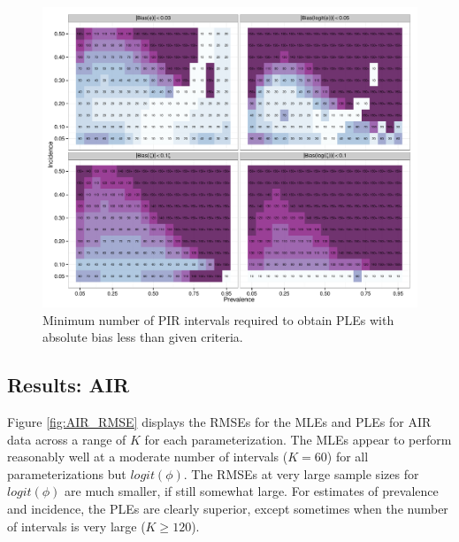\documentclass[man, noextraspace, floatsintext]{apa6}\usepackage[]{graphicx}\usepackage[]{color}
\makeatletter
\def\maxwidth{ %
  \ifdim\Gin@nat@width>\linewidth
    \linewidth
  \else
    \Gin@nat@width
  \fi
}
\newenvironment{knitrout}{}{} %
\makeatother
\begin{document}
\begin{knitrout}
\color{fgcolor}\begin{figure}[tb]


{\centering \includegraphics[width=\maxwidth]{fig/PIR_sample_size} 

}

\caption[Minimum number of PIR intervals required to obtain PLEs with absolute bias less than given criteria]{Minimum number of PIR intervals required to obtain PLEs with absolute bias less than given criteria.\label{fig:PIR_sample_size}}
\end{figure}


\end{knitrout}

\subsection{Results: AIR}
Figure \ref{fig:AIR_RMSE} displays the RMSEs for the MLEs and PLEs for AIR data across a range of $K$ for each parameterization. The MLEs appear to perform reasonably well at a moderate number of intervals ($K = 60$) for all parameterizations but $logit(\phi)$. The RMSEs at very large sample sizes for $logit(\phi)$ are much smaller, if still somewhat large. For estimates of prevalence and incidence, the PLEs are clearly superior, except sometimes when the number of intervals is very large ($K \geq 120$).
\end{document}

